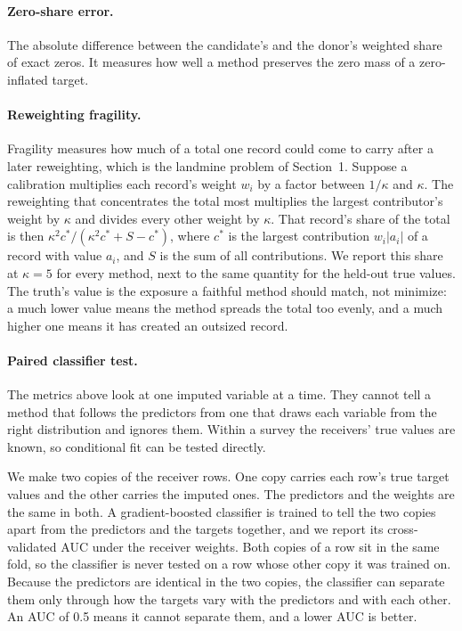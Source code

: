 \paragraph{Zero-share error.} The absolute difference between the
candidate's and the donor's weighted share of exact zeros. It measures how
well a method preserves the zero mass of a zero-inflated target.

\paragraph{Reweighting fragility.} Fragility measures how much of a total
one record could come to carry after a later reweighting, which is the
landmine problem of Section~1. Suppose a calibration multiplies each
record's weight $w_i$ by a factor between $1/\kappa$ and $\kappa$. The
reweighting that concentrates the total most multiplies the largest
contributor's weight by $\kappa$ and divides every other weight by $\kappa$.
That record's share of the total is then
$\kappa^2 c^* / (\kappa^2 c^* + S - c^*)$, where $c^*$ is the largest
contribution $w_i |a_i|$ of a record with value $a_i$, and $S$ is the sum of
all contributions. We report this share at $\kappa = 5$ for every method,
next to the same quantity for the held-out true values. The truth's value is
the exposure a faithful method should match, not minimize: a much lower
value means the method spreads the total too evenly, and a much higher one
means it has created an outsized record.

\paragraph{Paired classifier test.} The metrics above look at one imputed
variable at a time. They cannot tell a method that follows the predictors
from one that draws each variable from the right distribution and ignores
them. Within a survey the receivers' true values are known, so conditional
fit can be tested directly.

We make two copies of the receiver rows. One copy carries each row's true
target values and the other carries the imputed ones. The predictors and the
weights are the same in both. A gradient-boosted classifier is trained to
tell the two copies apart from the predictors and the targets together, and
we report its cross-validated AUC under the receiver weights. Both copies of
a row sit in the same fold, so the classifier is never tested on a row whose
other copy it was trained on. Because the predictors are identical in the
two copies, the classifier can separate them only through how the targets
vary with the predictors and with each other. An AUC of 0.5 means it cannot
separate them, and a lower AUC is better.

